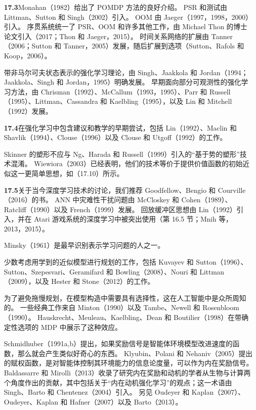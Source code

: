 \documentclass[UTF8, 12pt, fontset=fandol, oneside]{ctexart}
\begin{document}
\noindent\textbf{17.3}\quad Monahan（1982）给出了 POMDP 方法的良好介绍。
PSR 和测试由 Littman、Sutton 和 Singh（2002）引入。
OOM 由 Jaeger（1997，1998，2000）引入。
序贯系统统一了 PSR、OOM 和许多其他工作，由 Michael Thon 的博士论文引入（2017；Thon 和 Jaeger，2015）。
时间关系网络的扩展由 Tanner（2006；Sutton 和 Tanner，2005）发展，随后扩展到选项（Sutton、Rafols 和 Koop，2006）。

带非马尔可夫状态表示的强化学习理论，由 Singh、Jaakkola 和 Jordan（1994；Jaakkola、Singh 和 Jordan，1995）明确发展。
早期面向部分可观测性的强化学习方法，由 Chrisman（1992）、McCallum（1993，1995）、Parr 和 Russell（1995）、Littman、Cassandra 和 Kaelbling（1995），以及 Lin 和 Mitchell（1992）发展。

\noindent\textbf{17.4}\quad 在强化学习中包含建议和教学的早期尝试，包括 Lin（1992）、Maclin 和 Shavlik（1994）、Clouse（1996）以及 Clouse 和 Utgoff（1992）的工作。

Skinner 的塑形不应与 Ng、Harada 和 Russell（1999）引入的“基于势的塑形”技术混淆。
Wiewiora（2003）已经表明，他们的技术等价于提供价值函数的初始近似这一更简单思想，如（17.10）所示。

\noindent\textbf{17.5}\quad 关于当今深度学习技术的讨论，我们推荐 Goodfellow、Bengio 和 Courville（2016）的书。
ANN 中灾难性干扰问题由 McCloskey 和 Cohen（1989）、Ratcliff（1990）以及 French（1999）发展。
回放缓冲区思想由 Lin（1992）引入，并在 Atari 游戏系统的深度学习中被突出使用（第 16.5 节；Mnih 等，2013，2015）。

Minsky（1961）是最早识别表示学习问题的人之一。

少数考虑用学到的近似模型进行规划的工作，包括 Kuvayev 和 Sutton（1996）、Sutton、Szepesvari、Geramifard 和 Bowling（2008）、Nouri 和 Littman（2009），以及 Hester 和 Stone（2012）的工作。

为了避免拖慢规划，在模型构造中需要具有选择性，这在人工智能中是众所周知的。
一些经典工作来自 Minton（1990）以及 Tambe、Newell 和 Rosenbloom（1990）。
Hauskrecht、Meuleau、Kaelbling、Dean 和 Boutilier（1998）在带确定性选项的 MDP 中展示了这种效应。

Schmidhuber（1991a,b）提出，如果奖励信号是智能体环境模型改进速度的函数，那么就会产生类似好奇心的东西。
Klyubin、Polani 和 Nehaniv（2005）提出的赋权函数，是对智能体控制其环境能力的信息论度量，可以作为内在奖励信号。
Baldassarre 和 Mirolli（2013）收录了研究内在奖励和动机的学者从生物与计算两个角度作出的贡献，其中包括关于“内在动机强化学习”的观点；这一术语由 Singh、Barto 和 Chentenez（2004）引入。
另见 Oudeyer 和 Kaplan（2007）、Oudeyer、Kaplan 和 Hafner（2007）以及 Barto（2013）。
\end{document}
